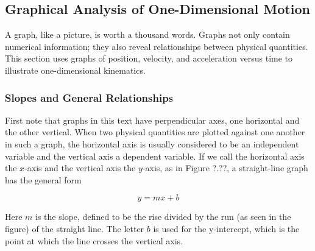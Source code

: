\documentclass[dvipsnames]{article}
\begin{document}
\subsection{Graphical Analysis of One-Dimensional Motion}

A graph, like a picture, is worth a thousand words. Graphs not only contain numerical information; they also reveal relationships between physical quantities. This section uses graphs of position, velocity, and acceleration versus time to illustrate one-dimensional kinematics.

\subsubsection*{Slopes and General Relationships}

First note that graphs in this text have perpendicular axes, one horizontal and the other vertical. When two physical quantities are plotted against one another in such a graph, the horizontal axis is usually considered to be an \gls{independent variable} and the vertical axis a \gls{dependent variable}. If we call the horizontal axis the  $x$-axis and the vertical axis the $y$-axis, as in Figure ?.??, a straight-line graph has the general form

\begin{equation}
    y = mx + b
\end{equation}

Here $m$ is the \gls{slope}, defined to be the rise divided by the run (as seen in the figure) of the straight line. The letter $b$ is used for the \gls{y-intercept}, which is the point at which the line crosses the vertical axis.

\begin{center}
\end{center}
\end{document}

